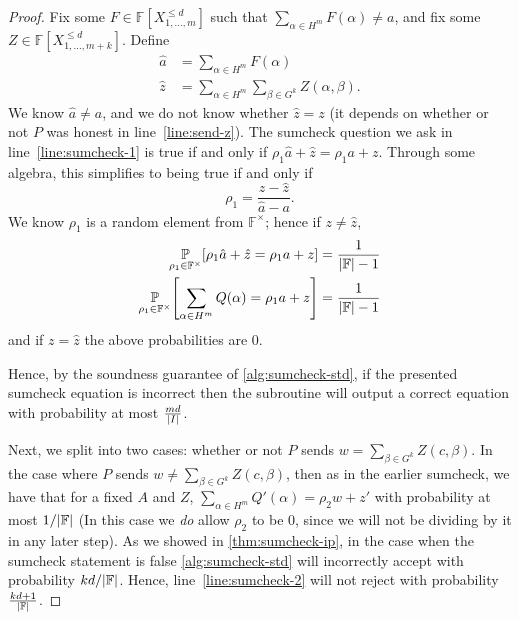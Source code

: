 \documentclass[english,12pt]{reedthesis}
\theoremstyle{plain}
\theoremstyle{definition}
\theoremstyle{remark}
\DeclarePairedDelimiter{\abs}{\lvert}{\rvert}
\begin{document}
\begin{proof}
  Fix some $F \in \mathbb{F}[X_{1, \ldots, m}^{\le d}]$ such that
  $\sum_{\alpha \in H^{m}}F(\alpha) \ne a$, and fix some $Z \in \mathbb{F}[X_{1, \ldots, m+k}^{\le d}]$.
  Define
  \begin{align*}
    \hat{a} &= \sum_{\alpha \in H^{m}}F(\alpha) \\
    \hat{z} &= \sum_{\alpha \in H^{m}}\sum_{\beta \in G^{k}}Z(\alpha, \beta).
  \end{align*}
  We know $\hat{a} \ne a$, and we do not know whether $\hat{z} = z$ (it depends on
  whether or not $P$ was honest in line~\ref{line:send-z}). The sumcheck
  question we ask in line~\ref{line:sumcheck-1} is true if and only if
  $\rho_{1}\hat{a} + \hat{z} = \rho_{1}a + z$. Through some algebra, this simplifies
  to being true if and only if
  \begin{equation}
    \rho_{1} = \frac{z - \hat{z}}{\hat{a} - a}.
  \end{equation}
  We know $\rho_{1}$ is a random element from $\mathbb{F}^{\times}$; hence if
  $z \ne \hat{z}$,
  \begin{align}
    \underset{\rho_{1} \in \mathbb{F}^{\times}}{\mathbb{P}}[\rho_{1}\hat{a} + \hat{z} = \rho_{1}a + z] &= \frac{1}{\abs{\mathbb{F}} - 1} \\
    \underset{\rho_{1} \in \mathbb{F}^{\times}}{\mathbb{P}}\mleft[\sum_{\alpha \in H^{m}}Q(\alpha) = \rho_{1}a + z\mright] &= \frac{1}{\abs{\mathbb{F}} - 1}
  \end{align}
  and if $z = \hat{z}$ the above probabilities are 0.

  Hence, by the soundness guarantee of \cref{alg:sumcheck-std}, if the presented
  sumcheck equation is incorrect then the subroutine will output a correct
  equation with probability at most $\frac{md}{\abs{I}}$.

  Next, we split into two cases: whether or not $P$ sends
  $w = \sum_{\beta \in G^{k}}Z(c, \beta)$. In the case where $P$ sends
  $w \ne \sum_{\beta \in G^{k}}Z(c, \beta)$, then as in the earlier sumcheck, we have that for
  a fixed $A$ and $Z$, $\sum_{\alpha \in H^{m}}Q'(\alpha) = \rho_{2}w + z'$ with probability at
  most $1/\abs{\mathbb{F}}$ (In this case we \emph{do} allow $\rho_{2}$ to be 0,
  since we will not be dividing by it in any later step). As we showed in
  \cref{thm:sumcheck-ip}, in the case when the sumcheck statement is false
  \cref{alg:sumcheck-std} will incorrectly accept with probability
  $kd/\abs{\mathbb{F}}$. Hence, line~\ref{line:sumcheck-2} will not reject with
  probability $\frac{kd + 1}{\abs{\mathbb{F}}}$.


\end{proof}
\end{document}
